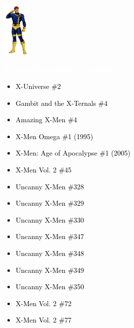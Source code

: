 \documentclass[12pt]{article}
\newcommand{\checkbox}{\raisebox{0.0ex}{\fbox{\rule{0ex}{1.5ex} \rule{1.5ex}{0ex}}}}
\begin{document}
\begin{center}
    \vspace*{2cm}
    \includegraphics[width=0.1\textwidth]{cyclops.png}
    \vspace{0.3cm}

    {\Huge \textbf{\textcolor{white}{X-Men Chronological Checklist}}}
\end{center}

\vspace{0.3cm}
\noindent
\begin{tcolorbox}[
  colback=white!95!gray,
  colframe=black,
  width=\textwidth,
  arc=4mm,
  auto outer arc,
  boxrule=0.8pt,
  left=8pt,right=8pt,top=8pt,bottom=8pt
]
\begin{itemize}[left=0pt,label={\checkbox}]
  \item \textcolor{black}{X-Universe \#2}
  \item \textcolor{black}{Gambit and the X-Ternals \#4}
  \item \textcolor{black}{Amazing X-Men \#4}
  \item \textcolor{black}{X-Men Omega \#1 (1995)}
  \item \textcolor{black}{X-Men: Age of Apocalypse \#1 (2005)}
  \item \textcolor{black}{X-Men Vol. 2 \#45}
  \item \textcolor{black}{Uncanny X-Men \#328}
  \item \textcolor{black}{Uncanny X-Men \#329}
  \item \textcolor{black}{Uncanny X-Men \#330}
  \item \textcolor{black}{Uncanny X-Men \#347}
  \item \textcolor{black}{Uncanny X-Men \#348}
  \item \textcolor{black}{Uncanny X-Men \#349}
  \item \textcolor{black}{Uncanny X-Men \#350}
  \item \textcolor{black}{X-Men Vol. 2 \#72}
  \item \textcolor{black}{X-Men Vol. 2 \#77}
\end{itemize}
\end{tcolorbox}
\end{document}

